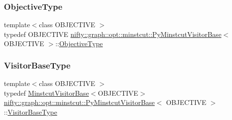 \mbox{\label{classnifty_1_1graph_1_1opt_1_1minstcut_1_1PyMinstcutVisitorBase_ae5e6bbf1ab459caf331a335a06e60a88}} 
\subsubsection{\texorpdfstring{Objective\+Type}{ObjectiveType}}
{\footnotesize\ttfamily template$<$class O\+B\+J\+E\+C\+T\+I\+VE $>$ \\
typedef O\+B\+J\+E\+C\+T\+I\+VE \hyperlink{classnifty_1_1graph_1_1opt_1_1minstcut_1_1PyMinstcutVisitorBase}{nifty\+::graph\+::opt\+::minstcut\+::\+Py\+Minstcut\+Visitor\+Base}$<$ O\+B\+J\+E\+C\+T\+I\+VE $>$\+::\hyperlink{classnifty_1_1graph_1_1opt_1_1minstcut_1_1PyMinstcutVisitorBase_ae5e6bbf1ab459caf331a335a06e60a88}{Objective\+Type}}

\mbox{\label{classnifty_1_1graph_1_1opt_1_1minstcut_1_1PyMinstcutVisitorBase_acb291bd40b0ab9974047df906651d5eb}} 
\subsubsection{\texorpdfstring{Visitor\+Base\+Type}{VisitorBaseType}}
{\footnotesize\ttfamily template$<$class O\+B\+J\+E\+C\+T\+I\+VE $>$ \\
typedef \hyperlink{namespacenifty_1_1graph_1_1opt_1_1minstcut_a42d7fa14edf7c8f367a49541f392e5aa}{Minstcut\+Visitor\+Base}$<$O\+B\+J\+E\+C\+T\+I\+VE$>$ \hyperlink{classnifty_1_1graph_1_1opt_1_1minstcut_1_1PyMinstcutVisitorBase}{nifty\+::graph\+::opt\+::minstcut\+::\+Py\+Minstcut\+Visitor\+Base}$<$ O\+B\+J\+E\+C\+T\+I\+VE $>$\+::\hyperlink{classnifty_1_1graph_1_1opt_1_1minstcut_1_1PyMinstcutVisitorBase_acb291bd40b0ab9974047df906651d5eb}{Visitor\+Base\+Type}}



